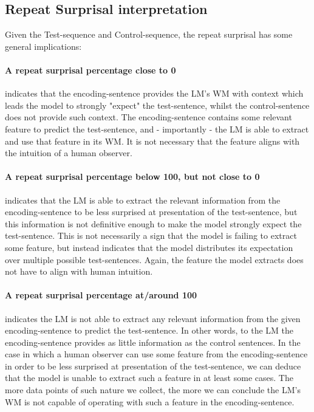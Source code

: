 \subsection{Repeat Surprisal interpretation}
Given the Test-sequence and Control-sequence, the repeat surprisal has some general implications:

\paragraph{A repeat surprisal percentage close to 0}
indicates that the encoding-sentence provides the LM's WM with context which leads the model to strongly "expect" the test-sentence, whilst the control-sentence does not provide such context.
The encoding-sentence contains some relevant feature to predict the test-sentence, and - importantly - the LM is able to extract and use that feature in its WM.
It is not necessary that the feature aligns with the intuition of a human observer.

\paragraph{A repeat surprisal percentage below 100, but not close to 0}
indicates that the LM is able to extract the relevant information from the encoding-sentence to be less surprised at presentation of the test-sentence, but this information is not definitive enough to make the model strongly expect the test-sentence. This is not necessarily a sign that the model is failing to extract some feature, but instead indicates that the model distributes its expectation over multiple possible test-sentences. Again, the feature the model extracts does not have to align with human intuition.
\paragraph{A repeat surprisal percentage at/around 100}
indicates the LM is not able to extract any relevant information from the given encoding-sentence to predict the test-sentence. In other words, to the LM the encoding-sentence provides as little information as the control sentences. In the case in which a human observer can use some feature from the encoding-sentence in order to be less surprised at presentation of the test-sentence, we can deduce that the model is unable to extract such a feature in at least some cases. The more data points of such nature we collect, the more we can conclude the LM's WM is not capable of operating with such a feature in the encoding-sentence. %
